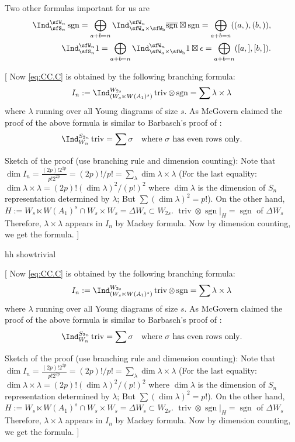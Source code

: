 \documentclass[12pt,a4paper]{amsart}
\newcommand{\trivial}[2][]{\if\relax\detokenize{#1}\relax
  {%
      \color{orange} \vspace{0em} $[$  #2 $]$
      \color{black}
  }
  \else
\ifx#1h
\ifcsname showtrivial\endcsname
{%
    \color{orange} \vspace{0em}  $[$ #2 $]$
    \color{black}
}
\fi
\else {\red Wrong argument!} \fi
\fi
}
\newcommand{\sgn}{\operatorname{sgn}}
\newcommand{\triv}{\operatorname{triv}}
\numberwithin{equation}{section}
\theoremstyle{remark}
\def\Irr{\mathrm{Irr}}
\def\bsgn{\overline{\sgn}}
\def\hsgn{\widetilde{\mathrm{sgn}}}
\begin{document}
Two other formulas important for us are
\begin{equation}\label{eq:indSW}
\begin{split}
\Ind_{\sfS_{n}}^{\sfW_{n}}\sgn = \bigoplus_{a+b=n}\Ind_{\sfW_{a}\times \sfW_{\mathrm b}}^{\sfW_{n}} \bsgn\boxtimes \sgn =\bigoplus_{a+b=n} ((a,),(b,)), \\
\Ind_{\sfS_{n}}^{\sfW_{n}} 1 = \bigoplus_{a+b=n}\Ind_{\sfW_{a}\times \sfW_{\mathrm b}}^{\sfW_{n}} 1 \boxtimes \epsilon =\bigoplus_{a+b=n} ([a,],[b,]).
\end{split}
\end{equation}


\trivial[h]{ %
  Now \eqref{eq:CC.C} is obtained by the following branching formula:
  \cite[p220 (6)]{Mc}
  \[
    I_n:= \Ind_{(W_s\ltimes W(A_1)^s)}^{W_{2s}}\triv\otimes \sgn = \sum \lambda\times \lambda
  \]
  where $\lambda$ running over all Young diagrams of size $s$. As McGovern
  claimed the proof of the above formula is similar to Barbasch's proof of
  \cite[Lemma~4.1]{BV.W}:
  \[
    \Ind_{W_n}^{S_{2n}} \triv = \sum \sigma \quad \text{where $\sigma$ has even
      rows only}.
  \]

  Sketch of the proof (use branching rule and dimension counting): Note that
  $\dim I_n = \frac{(2p)! 2^{2p}}{p! 2^{2p}} = (2p)!/p! =\sum_\lambda \dim \lambda\times \lambda$
  (For the last equality:
  $\dim \lambda\times \lambda = (2p)! (\dim \lambda)^2/(p!)^2$ where
  $\dim \lambda$ is the dimension of $S_n$ representation determined by
  $\lambda$; But $\sum (\dim \lambda)^2 = p!$). On the other hand,
  $H :=W_s\ltimes W(A_1)^s\cap W_s\times W_s = \Delta W_s \subset W_{2s}$.
  $\triv \otimes \sgn|_H = \sgn$ of $\Delta W_s$ Therefore,
  $\lambda\times \lambda$ appears in $I_n$ by Mackey formula. Now by dimension
  counting, we get the formula. }

\medskip
\end{document}
